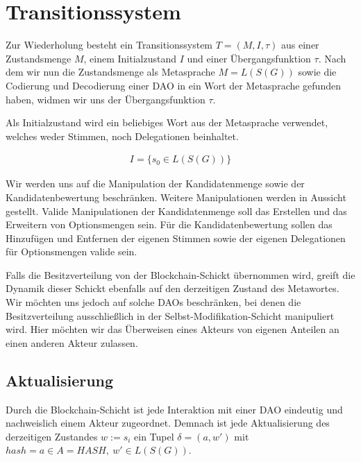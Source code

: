 \documentclass[a4paper,12pt]{report}
\begin{document}
\section{Transitionssystem}
\label{transsys}

Zur Wiederholung besteht ein Transitionssystem $T=(M,I,\tau)$ aus einer Zustandsmenge $M$, einem Initialzustand $I$ und einer Übergangsfunktion $\tau$.
Nach dem wir nun die Zustandsmenge als Metasprache $M=L(S(G))$ sowie die Codierung und Decodierung einer DAO in ein Wort der Metasprache gefunden haben, widmen wir uns der Übergangsfunktion $\tau$.

Als Initialzustand wird ein beliebiges Wort aus der Metasprache verwendet, welches weder Stimmen, noch Delegationen beinhaltet.

\begin{eqnarray}
I = \{s_0\in L(S(G))\}
\end{eqnarray}

Wir werden uns auf die Manipulation der Kandidatenmenge sowie der Kandidatenbewertung beschränken. Weitere Manipulationen werden in Aussicht gestellt. Valide Manipulationen der Kandidatenmenge soll das Erstellen und das Erweitern von Optionsmengen sein. Für die Kandidatenbewertung sollen das Hinzufügen und Entfernen der eigenen Stimmen sowie der eigenen Delegationen für Optionsmengen valide sein. 

Falls die Besitzverteilung von der Blockchain-Schickt übernommen wird, greift die Dynamik dieser Schickt ebenfalls auf den derzeitigen Zustand des Metawortes. Wir möchten uns jedoch auf solche DAOs beschränken, bei denen die Besitzverteilung ausschließlich in der Selbst-Modifikation-Schicht manipuliert wird. Hier möchten wir das Überweisen eines Akteurs von eigenen Anteilen an einen anderen Akteur zulassen.


% 
% 
% 
% 
% 

\subsection{Aktualisierung}
Durch die Blockchain-Schicht ist jede Interaktion mit einer DAO eindeutig und nachweislich einem Akteur zugeordnet. Demnach ist jede Aktualisierung des derzeitigen Zustandes $w := s_i$ ein Tupel $\delta = (a,w')$ mit $hash=a\in A=HASH,\ w'\in L(S(G))$.
\end{document}
